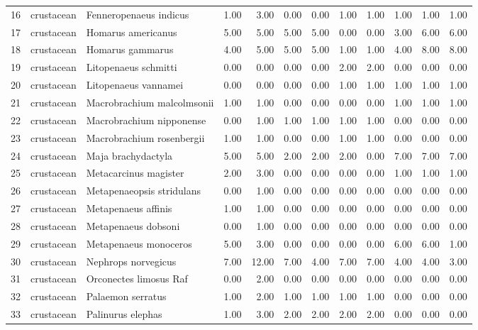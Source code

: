 \begin{table}[ht]
\begin{tabular}{rllrrrrrrrrr}
  16 & crustacean & Fenneropenaeus indicus & 1.00 & 3.00 & 0.00 & 0.00 & 1.00 & 1.00 & 1.00 & 1.00 & 1.00 \\ 
  17 & crustacean & Homarus americanus & 5.00 & 5.00 & 5.00 & 5.00 & 0.00 & 0.00 & 3.00 & 6.00 & 6.00 \\ 
  18 & crustacean & Homarus gammarus & 4.00 & 5.00 & 5.00 & 5.00 & 1.00 & 1.00 & 4.00 & 8.00 & 8.00 \\ 
  19 & crustacean & Litopenaeus schmitti & 0.00 & 0.00 & 0.00 & 0.00 & 2.00 & 2.00 & 0.00 & 0.00 & 0.00 \\ 
  20 & crustacean & Litopenaeus vannamei & 0.00 & 0.00 & 0.00 & 0.00 & 1.00 & 1.00 & 1.00 & 1.00 & 1.00 \\ 
  21 & crustacean & Macrobrachium malcolmsonii & 1.00 & 1.00 & 0.00 & 0.00 & 0.00 & 0.00 & 1.00 & 1.00 & 1.00 \\ 
  22 & crustacean & Macrobrachium nipponense & 0.00 & 1.00 & 1.00 & 1.00 & 1.00 & 1.00 & 0.00 & 0.00 & 0.00 \\ 
  23 & crustacean & Macrobrachium rosenbergii & 1.00 & 1.00 & 0.00 & 0.00 & 1.00 & 1.00 & 0.00 & 0.00 & 0.00 \\ 
  24 & crustacean & Maja brachydactyla & 5.00 & 5.00 & 2.00 & 2.00 & 2.00 & 0.00 & 7.00 & 7.00 & 7.00 \\ 
  25 & crustacean & Metacarcinus magister & 2.00 & 3.00 & 0.00 & 0.00 & 0.00 & 0.00 & 1.00 & 1.00 & 1.00 \\ 
  26 & crustacean & Metapenaeopsis stridulans & 0.00 & 1.00 & 0.00 & 0.00 & 0.00 & 0.00 & 0.00 & 0.00 & 0.00 \\ 
  27 & crustacean & Metapenaeus affinis & 1.00 & 1.00 & 0.00 & 0.00 & 0.00 & 0.00 & 0.00 & 0.00 & 0.00 \\ 
  28 & crustacean & Metapenaeus dobsoni & 0.00 & 1.00 & 0.00 & 0.00 & 0.00 & 0.00 & 0.00 & 0.00 & 0.00 \\ 
  29 & crustacean & Metapenaeus monoceros & 5.00 & 3.00 & 0.00 & 0.00 & 0.00 & 0.00 & 6.00 & 6.00 & 1.00 \\ 
  30 & crustacean & Nephrops norvegicus & 7.00 & 12.00 & 7.00 & 4.00 & 7.00 & 7.00 & 4.00 & 4.00 & 3.00 \\ 
  31 & crustacean & Orconectes limosus Raf & 0.00 & 2.00 & 0.00 & 0.00 & 0.00 & 0.00 & 0.00 & 0.00 & 0.00 \\ 
  32 & crustacean & Palaemon serratus & 1.00 & 2.00 & 1.00 & 1.00 & 1.00 & 1.00 & 0.00 & 0.00 & 0.00 \\ 
  33 & crustacean & Palinurus elephas & 1.00 & 3.00 & 2.00 & 2.00 & 2.00 & 2.00 & 0.00 & 0.00 & 0.00 \\ 

\end{tabular}
\end{table}
